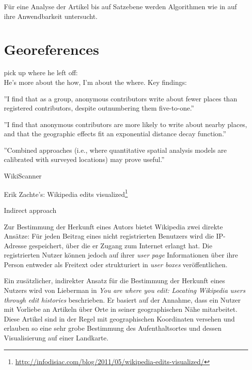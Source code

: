 Für eine Analyse der Artikel bis auf Satzebene werden Algorithmen wie in \cite{kramer2008wiki} auf ihre Anwendbarkeit untersucht.


\section{Georeferences}\label{sec:georeference}


\begin{todos}
    \item pick up where he left off:  
    \\ He's more about the how, I'm about the where. Key findings:
    \item ''I find that as a group, anonymous contributors write about fewer places than registered contributors, despite outnumbering them five-to-one.'' \cite{hardy2011volunteered}
    \item ''I find that anonymous contributors are more likely to write about
nearby places, and that the geographic effects fit an exponential distance decay
function.'' \cite{hardy2011volunteered}
    \item ''Combined approaches (i.e., where quantitative spatial analysis models
are calibrated with surveyed locations) may prove useful.''  \cite[p. 85]{hardy2011volunteered}
    \item WikiScanner
    \item Erik Zachte's: Wikipedia edits visualized\footnote{\url{http://infodisiac.com/blog/2011/05/wikipedia-edits-visualized/}}
    \item Indirect approach 
\end{todos}

Zur Bestimmung der Herkunft eines Autors bietet Wikipedia zwei direkte Ansätze: 
Für jeden Beitrag eines nicht registrierten Benutzers wird die IP-Adresse gespeichert, über die er Zugang zum Internet erlangt hat. 
Die registrierten Nutzer können jedoch auf ihrer \emph{user page} Informationen über ihre Person entweder als Freitext oder strukturiert in \emph{user boxes} veröffentlichen.

Ein zusätzlicher, indirekter Ansatz für die Bestimmung der Herkunft eines Nutzers wird von Lieberman in \emph{You are where you edit: Locating Wikipedia users through edit histories}\cite{lieberman2009you} beschrieben.
Er basiert auf der Annahme, dass ein Nutzer mit Vorliebe an Artikeln über Orte in seiner geographischen Nähe mitarbeitet. 
Diese Artikel sind in der Regel mit geographischen Koordinaten versehen und erlauben so eine sehr grobe Bestimmung des Aufenthaltsortes und dessen Visualisierung auf einer Landkarte.


